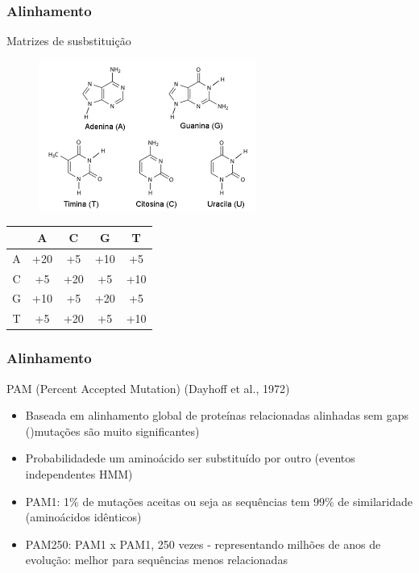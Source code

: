\documentclass{beamer}
\begin{document}
	\begin{frame}\frametitle{Alinhamento}
		\begin{block}{Matrizes de susbstituição}
		
		\begin{minipage}{\textwidth}
			\begin{minipage}[ht]{0.49\textwidth}
				\begin{figure}[ht]
					\centering
					\includegraphics[scale=0.5]{img/pu_py.png}
				\end{figure}
			\end{minipage}
			\hfill
			\begin{minipage}[ht]{0.49\textwidth}
				\centering
				\begin{tabular}{c|c|c|c|c}
					~ & A  & C  & G  & T  \\ \hline
					A & +20 & +5  & +10 & +5  \\ \hline
					C & +5  & +20 & +5  & +10 \\ \hline
					G & +10 & +5  & +20 & +5  \\ \hline
					T & +5  & +20 & +5  & +10 \\
				\end{tabular}
			\end{minipage}
		\end{minipage}
		\end{block}
	\end{frame}
	
	\begin{frame}\frametitle{Alinhamento}
	\begin{block}{PAM (Percent Accepted Mutation) (Dayhoff et al., 1972)}
		\begin{itemize}
			\item Baseada em alinhamento global de proteínas relacionadas alinhadas sem gaps ()mutações são muito significantes)
			\item Probabilidadede um aminoácido ser substituído por outro (eventos independentes HMM)
			\item PAM1: 1\% de mutações aceitas ou seja as sequências tem 99\% de similaridade (aminoácidos idênticos)
			\item PAM250: PAM1 x PAM1, 250 vezes - representando milhões de anos de evolução: melhor para sequências menos relacionadas
		\end{itemize}
	\end{block}
	\end{frame}
	
\end{document}
